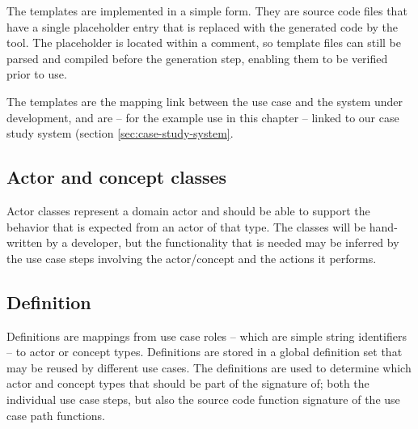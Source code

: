 \noindent The templates are implemented in a simple form. They are source code files that have a single placeholder entry that is replaced with the generated code by the tool. The placeholder is located within a comment, so template files can still be parsed and compiled before the generation step, enabling them to be verified prior to use.\medskip

\noindent The templates are the mapping link between the use case and the system under development, and are -- for the example use in this chapter -- linked to our case study system (section \ref{sec:case-study-system}.

\subsection{Actor and concept classes}
Actor classes represent a domain actor and should be able to support the behavior that is expected from an actor of that type. The classes will be hand-written by a developer, but the functionality that is needed may be inferred by the use case steps involving the actor/concept and the actions it performs.

\subsection{Definition}
Definitions are mappings from use case roles -- which are simple string identifiers -- to actor or concept types. Definitions are stored in a global definition set that may be reused by different use cases. The definitions are used to determine which actor and concept types that should be part of the signature of; both the individual use case steps, but also the source code function signature of the use case path functions.

